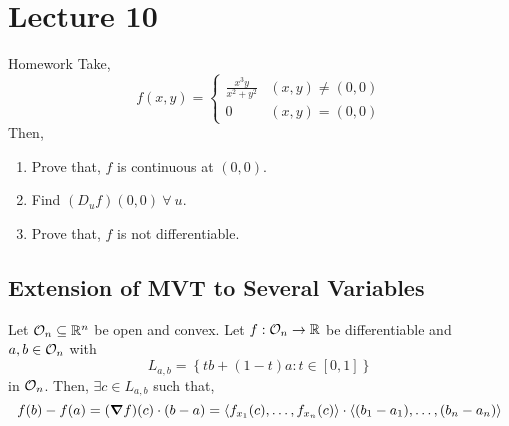\documentclass[../Analysis-3]{subfiles}
\begin{document}
\chapter*{Lecture 10} %
\setcounter{chapter}{10} %


\begin{Eg}{Homework}{}
    Take, \[ f(x,y) = \begin{cases}
            \frac{x^{3}y}{x^2 + y^2} & (x,y) \neq (0,0) \\
            0                        & (x,y) = (0,0)
        \end{cases}\]
    Then,
    \begin{enumerate}
        \item Prove that, $f$ is continuous at $(0,0)$.
        \item Find $(D_{u}f)(0,0)\ \forall\ u$.
        \item Prove that, $f$ is not differentiable.
    \end{enumerate}
\end{Eg}

\section{Extension of MVT to Several Variables}

\begin{Thm}{}{}
    Let $ \mathcal{O}_{n} \subseteq \mathbb{R}^n $ be open and convex. Let $f : \mathcal{O}_{n} \to \mathbb{R}$ be differentiable and $a,b \in \mathcal{O}_{n}$ with \[L_{a,b} = \left\{ tb + (1-t)a : t \in [0,1]\right\} \] in $\mathcal{O}_{n}$. Then, $\exists c \in L_{a,b}$ such that, \[ f(b) - f(a) = (\grad f)(c)\cdot (b-a) = \left\langle f_{x_1}(c), \ldots, f_{x_n}(c) \right\rangle\cdot\left\langle (b_1 - a_1), \ldots, (b_n - a_n) \right\rangle  \]
\end{Thm}
\end{document}
